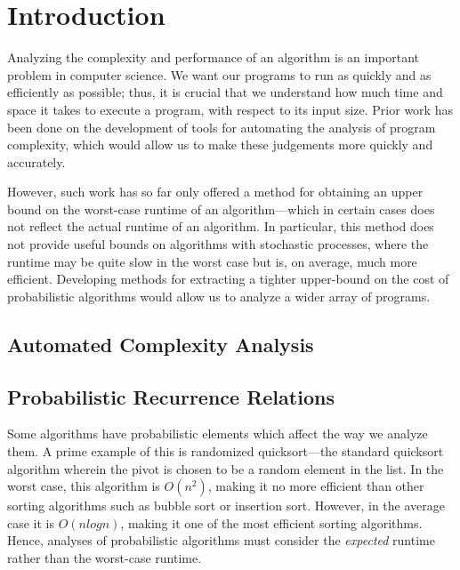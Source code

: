 \section{Introduction}
Analyzing the complexity and performance of an algorithm is an important problem in computer science. We want our programs to run as quickly and as efficiently as possible; thus, it is crucial that we understand how much time and space it takes to execute a program, with respect to its input size. Prior work has been done on the development of tools
for automating the analysis of program complexity, which would allow us to make these judgements more quickly and accurately. 

However, such work has so far only offered a method for obtaining an upper bound on the worst-case runtime of an algorithm---which in certain cases does not reflect the actual runtime of an algorithm. In particular, this method does not
provide useful bounds on algorithms with stochastic processes, where the runtime may be quite slow in the worst case but
is, on average, much more efficient. Developing methods for extracting a tighter upper-bound on the cost of probabilistic algorithms would allow us to analyze a wider array of programs.

\subsection{Automated Complexity Analysis}

\subsection{Probabilistic Recurrence Relations}

Some algorithms have probabilistic elements which affect the way we analyze them. A prime example of this is randomized 
quicksort---the standard quicksort algorithm wherein the pivot is chosen to be a random element in the list. In the worst case,
this algorithm is $O(n^2)$, making it no more efficient than other sorting algorithms such as bubble sort or insertion sort. 
However, in the average case it is $O(nlogn)$, making it one of the most efficient sorting algorithms. Hence, analyses of probabilistic algorithms must consider the \emph{expected} runtime rather than the worst-case runtime. 

